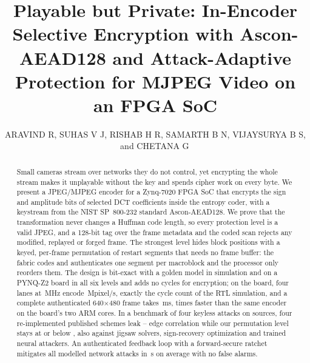 \documentclass{ieeeaccess}
\theoremstyle{definition}\newtheorem{definition}{Definition}
\begin{document}
\title{Playable but Private: In-Encoder Selective Encryption with Ascon-AEAD128 and Attack-Adaptive Protection for MJPEG Video on an FPGA SoC}
\author{\uppercase{Aravind R}, \uppercase{Suhas V J}, \uppercase{Rishab H R}, \uppercase{Samarth B N}, \uppercase{Vijaysurya B S}, and \uppercase{Chetana G}\,}
\address[1]{Department of Electronics and Communication Engineering, RV College of Engineering, Bengaluru 560059, India }

\begin{abstract}
Small cameras stream over networks they do not control, yet encrypting the whole stream makes it unplayable without the key and spends cipher work on every byte. We present a JPEG/MJPEG encoder for a Zynq-7020 FPGA SoC that encrypts the sign and amplitude bits of selected DCT coefficients inside the entropy coder, with a keystream from the NIST SP~800-232 standard Ascon-AEAD128. We prove that the transformation never changes a Huffman code length, so every protection level is a valid JPEG, and a 128-bit tag over the frame metadata and the coded scan rejects any modified, replayed or forged frame. The strongest level hides block positions with a keyed, per-frame permutation of restart segments that needs no frame buffer: the fabric codes and authenticates one segment per macroblock and the processor only reorders them. The design is bit-exact with a golden model in simulation and on a PYNQ-Z2 board in all six levels and adds no cycles for encryption; on the board, four lanes at \BdFourMhz\,MHz encode \BdFourBusyMpix\,Mpixel/s, exactly the cycle count of the RTL simulation, and a complete authenticated 640$\times$480 frame takes \BdFourZcMs\,ms, \BdSpeedupFrame{} times faster than the same encoder on the board's two ARM cores. In a benchmark of four keyless attacks on \BenchSources{} sources, four re-implemented published schemes leak \BenchPubMin--\BenchPubMax{} edge correlation while our permutation level stays at or below \BenchEfiveMax{}, also against jigsaw solvers, sign-recovery optimization and trained neural attackers. An authenticated feedback loop with a forward-secure ratchet mitigates all \NumAttacks{} modelled network attacks in \TtmMean\,s on average with no false alarms.
\end{abstract}
\end{document}
